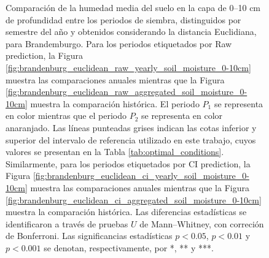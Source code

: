 \begin{figure}[htbp]
	\caption{
		Comparación de la humedad media del suelo en la capa de 0--10 cm de profundidad entre los periodos de siembra, distinguidos por semestre del año y obtenidos considerando la distancia Euclidiana, para Brandemburgo. Para los periodos etiquetados por Raw prediction, la Figura \ref{fig:brandenburg_euclidean_raw_yearly_soil_moisture_0-10cm} muestra las comparaciones anuales mientras que la Figura \ref{fig:brandenburg_euclidean_raw_aggregated_soil_moisture_0-10cm} muestra la comparación histórica. El periodo $P_1$ se representa en color mientras que el periodo $P_2$ se representa en color anaranjado. Las líneas punteadas grises indican las cotas inferior y superior del intervalo de referencia utilizado en este trabajo, cuyos valores se presentan en la Tabla \ref{tab:optimal_conditions}. Similarmente, para los periodos etiquetados por CI prediction, la Figura \ref{fig:brandenburg_euclidean_ci_yearly_soil_moisture_0-10cm} muestra las comparaciones anuales mientras que la Figura \ref{fig:brandenburg_euclidean_ci_aggregated_soil_moisture_0-10cm} muestra la comparación histórica. Las diferencias estadísticas se identificaron a través de pruebas $U$ de Mann--Whitney, con correción de Bonferroni. Las significancias estadísticas $p<0.05$, $p<0.01$ y $p<0.001$ se denotan, respectivamente, por *, ** y ***.
	}
	\label{fig:brandenburg_euclidean_soil_moisture_0-10cm}
	
	
\end{figure}



